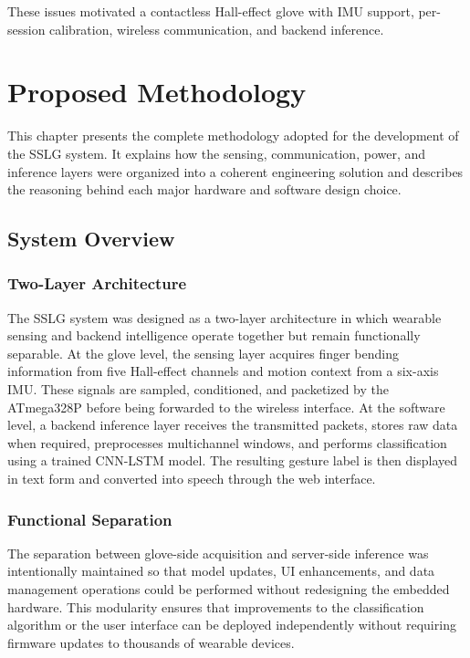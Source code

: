 \documentclass[12pt,a4paper]{report}
\begin{document}
These issues motivated a contactless Hall-effect glove with IMU support, per-session calibration, wireless communication, and backend inference.


\chapter{Proposed Methodology}

This chapter presents the complete methodology adopted for the development of the SSLG system. It explains how the sensing, communication, power, and inference layers were organized into a coherent engineering solution and describes the reasoning behind each major hardware and software design choice.

\section{System Overview}
\label{sec:method_overview}

\subsection{Two-Layer Architecture}
The SSLG system was designed as a two-layer architecture in which wearable sensing and backend intelligence operate together but remain functionally separable. At the glove level, the sensing layer acquires finger bending information from five Hall-effect channels and motion context from a six-axis IMU. These signals are sampled, conditioned, and packetized by the ATmega328P before being forwarded to the wireless interface. At the software level, a backend inference layer receives the transmitted packets, stores raw data when required, preprocesses multichannel windows, and performs classification using a trained CNN-LSTM model. The resulting gesture label is then displayed in text form and converted into speech through the web interface.

\subsection{Functional Separation}
The separation between glove-side acquisition and server-side inference was intentionally maintained so that model updates, UI enhancements, and data management operations could be performed without redesigning the embedded hardware. This modularity ensures that improvements to the classification algorithm or the user interface can be deployed independently without requiring firmware updates to thousands of wearable devices.
\end{document}
